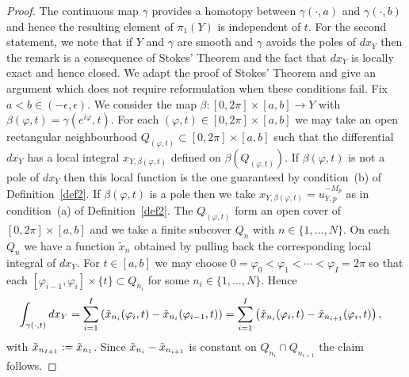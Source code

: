 \documentclass[11pt,twoside]{amsart}
\theoremstyle{plain}
\newcommand{\Sm}{\mathcal{S}}
\newcommand{\dfx}{dx}
\begin{document}
\begin{proof}
The continuous map $\gamma$ provides a homotopy between $\gamma(\cdot,a)$ and $\gamma(\cdot,b)$ and hence the resulting element of $\pi_1(Y)$ is independent of $t$. For the second statement, we note that if $ Y $ and $\gamma$ are smooth and $\gamma$ avoids the poles of $\dfx_Y$ then the remark is a consequence of  Stokes' Theorem and the fact that $\dfx_Y$ is locally exact and hence closed. We adapt the proof of Stokes' Theorem and give an argument which does not require reformulation when these conditions fail.
Fix $a<b\in(-\epsilon,\epsilon)$.  We consider the map $\beta:[0,2\pi]\times[a,b]\to Y$ with $\beta(\varphi,t)=\gamma(e^{i\varphi},t)$. For each $(\varphi,t)\in[0,2\pi]\times[a,b]$ we may take an open rectangular neighbourhood $Q_{(\varphi,t)}\subset[0,2\pi]\times[a,b]$ such that the differential $\dfx_Y$ has a local integral $x_{Y,\beta(\varphi,t)}$ defined on $\beta(Q_{(\varphi,t)})$. If $\beta(\varphi,t)$ is not a pole of $\dfx_Y$ then this local function is the one guaranteed by condition~(b) of Definition~\ref{def2}. If $\beta(\varphi,t)$ is a pole then we take $x_{Y,\beta(\varphi,t)}=u_{Y,p}^{-M_p}$ as in condition~(a) of Definition~\ref{def2}. The $Q_{(\varphi,t)}$ form an open cover of $[0,2\pi]\times[a,b]$ and we take a finite subcover $Q_n$ with $n\in \{1,\dotsc,N\}$. On each $Q_n$ we have a function $\tilde{x}_n$ obtained by pulling back the corresponding local integral of $\dfx_Y$. For $ t\in [a, b] $ we may choose $ 0 = \varphi _0 <\varphi _1 <\cdots <\varphi _I = 2\pi $ so that each $ [\varphi _{i -1}, \varphi _i]\times\{t\}\subset Q_{n_i} $ for some $ n_i\in\{1, \ldots , N \} $. Hence
\begin{align*}
\int_{\gamma(\cdot,t)}\dfx_Y &=\sum_{i = 1} ^ I \left(\Tilde{x}_{n_i}(\varphi_i,t) - \Tilde{x}_{n_i} (\varphi_{i-1},t)\right)=\sum_{i=1}^I\left(\Tilde{x}_{n_i}(\varphi_i,t)-\Tilde{x}_{n_{i+1}}(\varphi_i,t)\right),
\end{align*}
with $\Tilde{x}_{n_{I+1}}:=\Tilde{x}_{n_1}$. Since $\Tilde{x}_{n_i}-\Tilde{x}_{n_{i+1}}$ is constant on $Q_{n_i}\cap Q_{n_{i+1}}$ the claim follows.
%
\end{proof}
\end{document}
